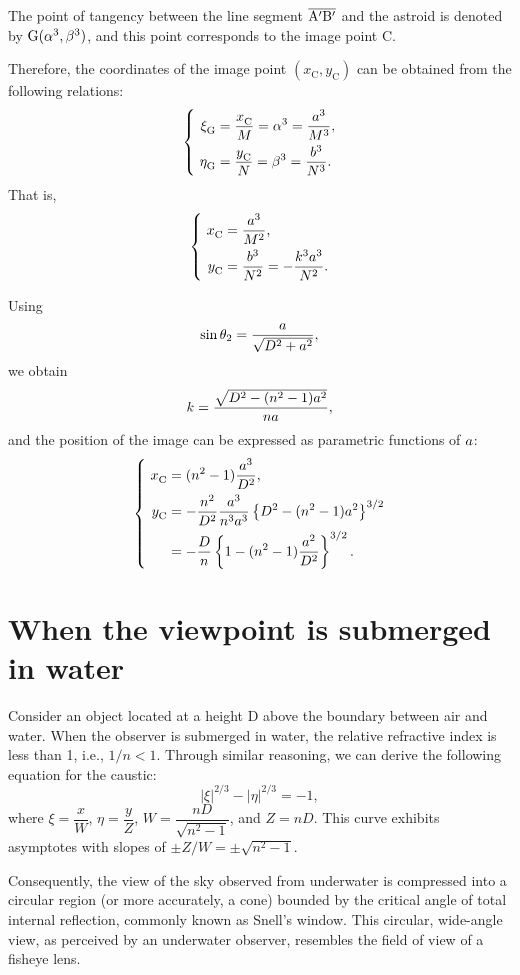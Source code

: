 \documentclass[twocolumn]{article}
\begin{document}
The point of tangency between the line segment $\overline{\mathrm{{A^{\prime}}{B^{\prime}}}}$ and the astroid is denoted by $\mathrm{G}({\alpha}^3, {\beta}^3)$, and this point corresponds to the image point C. 

Therefore, the coordinates of the image point $(x_{\mathrm{C}}^{}, y_{\mathrm{C}}^{})$ can be obtained from the following relations:
$$ \left\{ 
\begin{aligned}
	\xi_{\mathrm{G}}^{} &= \dfrac{x_{\mathrm{C}}^{}}{M} = \greeka^3 = \dfrac{\romana^3}{M^3},\\
	\eta_{\mathrm{G}}^{} &= \dfrac{y_{\mathrm{C}}^{}}{N} = \greekb^3 = \dfrac{\romanb^3}{N^3}.
\end{aligned}
\right.$$
That is,
$$ \left\{ 
\begin{aligned}
	x_{\mathrm{C}}^{} &= \dfrac{\romana^3}{M^2},\\
	y_{\mathrm{C}}^{} &= \dfrac{\romanb^3}{N^2}=-\dfrac{k^3\romana^3}{N^2}.
\end{aligned}
\right.$$

Using 
$$\sin\theta_2 = \dfrac{{a}}{\sqrt{D^2+{a}^2}},$$
we obtain
$$k = \dfrac{\sqrt{D^2-(n^2-1){a}^2}}{n{a}},$$
and the position of the image can be expressed as parametric functions of ${a}$:
$$ \left\{ 
\begin{aligned}
	x_{\mathrm{C}}^{} &= (n^2-1)\dfrac{\romana^3}{D^2},\\
	y_{\mathrm{C}}^{} &= -\dfrac{n^2}{D^2}\dfrac{\romana^3}
	{n^3\romana^3}\left\{ D^2-(n^2-1)\romana^2 \right\}^{3/2}\\
	&=-\dfrac{D}{n}\left\{ 1-(n^2-1)\dfrac{\romana^2}{D^2} \right\}^{3/2}.
\end{aligned}
\right.$$

\section{When the viewpoint is submerged in water}

Consider an object located at a height D above the boundary between air and water. When the observer is submerged in water, the relative refractive index is less than 1, i.e., $1/n < 1$. Through similar reasoning, we can derive the following equation for the caustic:
$$ \left| \xi \right|^{2/3} - \left| \eta \right|^{2/3} = -1, $$
where $\xi = \dfrac{x}{W} $, $\eta = \dfrac{y}{Z}$, $W = \dfrac{nD}{\sqrt{n^2-1}}$, and $Z = nD$. This curve exhibits asymptotes with slopes of $\pm Z/W = \pm \sqrt{n^2-1}$. 

Consequently, the view of the sky observed from underwater is compressed into a circular region (or more accurately, a cone) bounded by the critical angle of total internal reflection, commonly known as Snell's window. This circular, wide-angle view, as perceived by an underwater observer, resembles the field of view of a fisheye lens.
\end{document}
